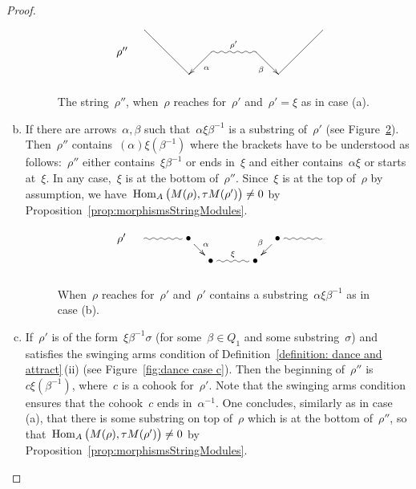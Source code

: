\documentclass{amsart}
\theoremstyle{definition}
\newcommand{\Hom}[1]{\operatorname{{\rm Hom}}_{#1}}
\begin{document}
\begin{proof}
\begin{enumerate}[(a)]
\begin{figure}[h]
 	\capstart
\[
\xy
%
(7,14)="lpeak";
(63,14)="rpeak";
%
(0,7)*+{\rho''}="10";
(28,7)="14";
(42,7)="16";
%
(21,0)="3";
(49,0)="7";
%
{\ar@{~}^{\rho'} "14";"16"};
%
{\ar^{\alpha} "14";"3"};
{\ar@{-} "lpeak";"3"};
%
{\ar_{\beta} "16";"7"};
{\ar@{-} "rpeak";"7"};
%
\endxy
\]
    \caption{The string~$\rho''$, when~$\rho$ reaches for~$\rho'$ and~$\rho'=\xi$ as in case (a).}
    \vspace{-.5cm}
    \label{fig:dance case a}
\end{figure}

\item If there are arrows~$\alpha, \beta$ such that~$\alpha\xi\beta^{-1}$ is a substring of~$\rho'$ (see Figure~\ref{fig:dance case b}).
 Then~$\rho''$ contains~$(\alpha)\xi(\beta^{-1})$ where the brackets have to be understood as follows:~$\rho''$ either contains~$\xi\beta^{-1}$ or ends in~$\xi$ and either contains~$\alpha\xi$ or starts at~$\xi$.
 In any case,~$\xi$ is at the bottom of~$\rho''$. Since~$\xi$ is at the top of~$\rho$ by assumption, we have~$\Hom{A} \big( M(\rho), \tau M(\rho') \big)\neq 0$ by Proposition~\ref{prop:morphismsStringModules}.

\begin{figure}[h]
 	\capstart
\[
\xy
%
(-35,14)*+{\rho'};
(-28,14)="-14";
(-14,14)*+{\bullet}="-12";
(-7,7)*+{\bullet}="-11";
(7,7)*+{\bullet}="11";
(14,14)*+{\bullet}="12";
(28,14)="14";
%
{\ar@{~} "-14";"-12"};
{\ar^{\alpha} "-12";"-11"};
{\ar@{~}^{\xi} "-11";"11"};
{\ar_{\beta} "12";"11"};
{\ar@{~} "12";"14"};
%
\endxy
\]
    \caption{When~$\rho$ reaches for~$\rho'$ and~$\rho'$ contains a substring~$\alpha\xi\beta^{-1}$ as in case (b).}
    \vspace{-.5cm}
    \label{fig:dance case b}
\end{figure}

\item If~$\rho'$ is of the form~$\xi\beta^{-1}\sigma$ (for some~$\beta\in Q_1$ and some substring~$\sigma$) and satisfies the swinging arms condition of Definition~\ref{definition: dance and attract}\,(ii) (see Figure~\ref{fig:dance case c}).
 Then the beginning of~$\rho''$ is~$c\xi(\beta^{-1})$, where~$c$ is a cohook for~$\rho'$. Note that the swinging arms condition ensures that the cohook~$c$ ends in~$\alpha^{-1}$.
 One concludes, similarly as in case (a), that there is some substring on top of~$\rho$ which is at the bottom of~$\rho''$, so that~$\Hom{A} \big( M(\rho), \tau M(\rho') \big) \ne 0$ by Proposition~\ref{prop:morphismsStringModules}.
 

\end{enumerate}
\end{proof}
\end{document}
